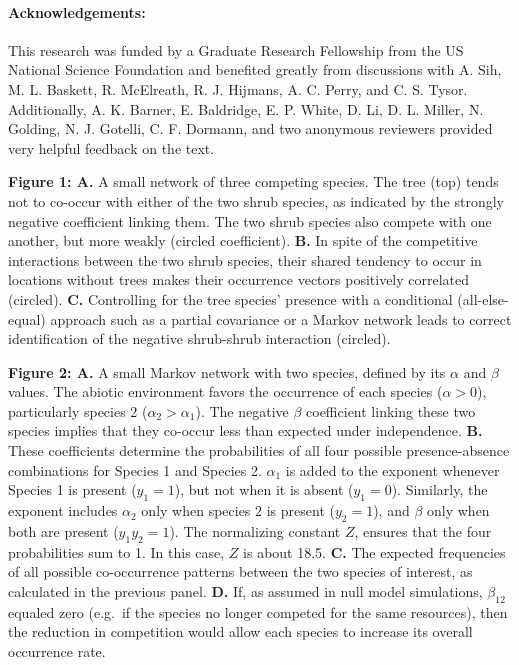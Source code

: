 \documentclass[12pt,]{article}
\begin{document}
\begin{spacing}{1.9}
\begin{flushleft}
\paragraph{Acknowledgements:}\label{acknowledgements}

This research was funded by a Graduate Research Fellowship from the US
National Science Foundation and benefited greatly from discussions with
A. Sih, M. L. Baskett, R. McElreath, R. J. Hijmans, A. C. Perry, and C.
S. Tysor. Additionally, A. K. Barner, E. Baldridge, E. P. White, D. Li,
D. L. Miller, N. Golding, N. J. Gotelli, C. F. Dormann, and two
anonymous reviewers provided very helpful feedback on the text.

\setlength{\parindent}{0cm}

\textbf{Figure 1: A.} A small network of three competing species. The
tree (top) tends not to co-occur with either of the two shrub species,
as indicated by the strongly negative coefficient linking them. The two
shrub species also compete with one another, but more weakly (circled
coefficient). \textbf{B.} In spite of the competitive interactions
between the two shrub species, their shared tendency to occur in
locations without trees makes their occurrence vectors positively
correlated (circled). \textbf{C.} Controlling for the tree species'
presence with a conditional (all-else-equal) approach such as a partial
covariance or a Markov network leads to correct identification of the
negative shrub-shrub interaction (circled).

\textbf{Figure 2: A.} A small Markov network with two species, defined
by its \(\alpha\) and \(\beta\) values. The abiotic environment favors
the occurrence of each species (\(\alpha >0\)), particularly species 2
(\(\alpha_2 > \alpha_1\)). The negative \(\beta\) coefficient linking
these two species implies that they co-occur less than expected under
independence. \textbf{B.} These coefficients determine the probabilities
of all four possible presence-absence combinations for Species 1 and
Species 2. \(\alpha_1\) is added to the exponent whenever Species 1 is
present (\(y_1 = 1\)), but not when it is absent (\(y_1 = 0\)).
Similarly, the exponent includes \(\alpha_2\) only when species \(2\) is
present (\(y_2 = 1\)), and \(\beta\) only when both are present
(\(y_1y_2 = 1\)). The normalizing constant \(Z\), ensures that the four
probabilities sum to 1. In this case, \(Z\) is about 18.5. \textbf{C.}
The expected frequencies of all possible co-occurrence patterns between
the two species of interest, as calculated in the previous panel.
\textbf{D.} If, as assumed in null model simulations, \(\beta_{12}\)
equaled zero (e.g.~if the species no longer competed for the same
resources), then the reduction in competition would allow each species
to increase its overall occurrence rate.


\end{flushleft}
\end{spacing}
\end{document}
